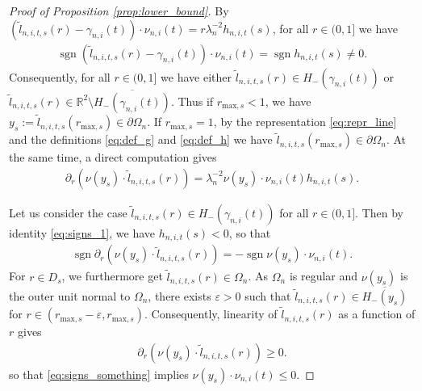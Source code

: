\documentclass[11pt]{article}
\numberwithin{statement}{section}
\numberwithin{equation}{section}
\theoremstyle{remark}
\newcommand{\R}{\mathbb R} 				%
\newcommand{\eps}{\varepsilon}
\begin{document}
\begin{proof}[Proof of Proposition \ref{prop:lower_bound}]
         By
         $ \left(\tilde l_{n,i,t,s}(r) - \gamma_{n,i}(t) \right) \cdot
         \nu_{n,i}(t) = r \lambda^{-2}_n h_{n,i,t}(s)$, for all
         $r \in (0,1]$ we have
        \begin{align}\label{eq:signs_1}
        	\operatorname{sgn}  \left(\tilde l_{n,i,t,s}(r) -
          \gamma_{n,i}(t) \right) \cdot \nu_{n,i}(t) =
          \operatorname{sgn} h_{n,i,t}(s) \neq 0.
	\end{align}
	Consequently, for all $r \in (0,1]$ we have either
        $\tilde l_{n,i,t,s}(r) \in H_-(\gamma_{n,i}(t))$ or
        $\tilde l_{n,i,t,s}(r) \in \R^2 \setminus
        \overline{H_-(\gamma_{n,i}(t))}$.  Thus if
        $ r_{\mathrm{max},s} < 1$, we have
        $y_{s} := \tilde l_{n,i,t,s}( r_{\mathrm{max},s} ) \in
        \partial \Omega_{n} $.  If $ r_{\mathrm{max},s} = 1$, by the
        representation \eqref{eq:repr_line} and the definitions
        \eqref{eq:def_g} and \eqref{eq:def_h} we have
        $ \tilde l_{n,i,t,s}( r_{\mathrm{max},s}) \in \partial
        \Omega_n$.  At the same time, a direct computation gives
       \begin{align}
         \partial_r \left( \nu(y_{s}) \cdot \tilde l_{n,i,t,s}(r)\right)
         = \lambda_n^{-2} \nu(y_{s})\cdot \nu_{n,i}(t) h_{n,i,t}(s). 
       \end{align}

       
       Let us consider the case
       $\tilde l_{n,i,t,s}(r) \in H_-(\gamma_{n,i}(t))$ for all
       $r\in (0,1]$.  Then by identity \eqref{eq:signs_1}, we have
       $h_{n,i,t}(s) <0$, so that
       \begin{align}\label{eq:signs_something}
         \operatorname{sgn} 	\partial_r \left( \nu(y_{s}) \cdot
         \tilde l_{n,i,t,s}(r)\right) = - 	\operatorname{sgn}
         \nu(y_{s})\cdot \nu_{n,i}(t). 
       \end{align}
       For $r \in D_{s}$, we furthermore get
       $\tilde l_{n,i,t,s}(r) \in \Omega_n$.  As $\Omega_n$ is regular
       and $\nu(y_{s})$ is the outer unit normal to $\Omega_n$, there
       exists $\eps>0$ such that
       $\tilde l_{n,i,t,s}(r) \in \overline{H_-(y_{s})}$ for
       $r \in (r_{\mathrm{max},s}-\eps, r_{\mathrm{max},s})$.
       Consequently, linearity of $\tilde l_{n,i,t,s}(r)$ as a
       function of $r$ gives
       \begin{align}
         \partial_r \left( \nu(y_{s}) \cdot \tilde l_{n,i,t,s}(r)\right) \geq 0.
       \end{align}
       so that \eqref{eq:signs_something} implies
       $\nu(y_{s})\cdot \nu_{n,i}(t) \leq 0$.
       

\end{proof}
\end{document}
